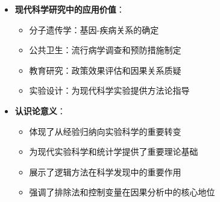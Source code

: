 \begin{center}
{{\begin{itemize}
\begin{itemize}
  \item \textbf{普遍性}：适用于各种类型的因果关系研究
  \end{itemize}
\item \textbf{现代科学研究中的应用价值}：
  \begin{itemize}
  \item 分子遗传学：基因-疾病关系的确定
  \item 公共卫生：流行病学调查和预防措施制定
  \item 教育研究：政策效果评估和因果关系质疑
  \item 实验设计：为现代科学实验提供方法论指导
  \end{itemize}
\item \textbf{认识论意义}：
  \begin{itemize}
  \item 体现了从经验归纳向实验科学的重要转变
  \item 为现代实验科学和统计学提供了重要理论基础
  \item 展示了逻辑方法在科学发现中的重要作用
  \item 强调了排除法和控制变量在因果分析中的核心地位
  \end{itemize}
\end{itemize}
}}
\end{center}